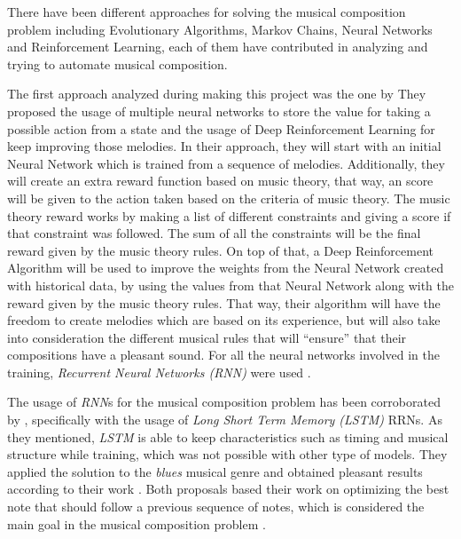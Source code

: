 There have been different approaches for solving the musical composition problem including Evolutionary Algorithms, Markov Chains, Neural Networks and Reinforcement Learning, each of them have contributed in analyzing and trying to automate musical composition.

The first approach analyzed during making this project was the one by \citeauthor{deeprl2016music} They proposed the usage of multiple neural networks to store the value for taking a possible action from a state and the usage of Deep Reinforcement Learning for keep improving those melodies. In their approach, they will start with an initial Neural Network which is trained from a sequence of melodies. Additionally, they will create an extra reward function based on music theory, that way, an score will be given to the action taken based on the criteria of music theory. The music theory reward works by making a list of different constraints and giving a score if that constraint was followed. The sum of all the constraints will be the final reward given by the music theory rules. On top of that, a Deep Reinforcement Algorithm will be used to improve the weights from the Neural Network created with historical data, by using the values from that Neural Network along with the reward given by the music theory rules. That way, their algorithm will have the freedom to create melodies which are based on its experience, but will also take into consideration the different musical rules that will ``ensure'' that their compositions have a pleasant sound. For all the neural networks involved in the training, \emph{Recurrent Neural Networks (RNN)} were used \cite{deeprl2016music}. 

The usage of \emph{RNN}s for the musical composition problem has been corroborated by \citeauthor{eck2002blues}, specifically with the usage of \emph{Long Short Term Memory (LSTM)} RRNs. As they mentioned, \emph{LSTM} is able to keep characteristics such as timing and musical structure while training, which was not possible with other type of models. They applied the solution to the \emph{blues} musical genre and obtained pleasant results according to their work \cite{eck2002blues}. Both proposals based their work on optimizing the best note that should follow a previous sequence of notes, which is considered the main goal in the musical composition problem \cite{connectionist1989}. 

